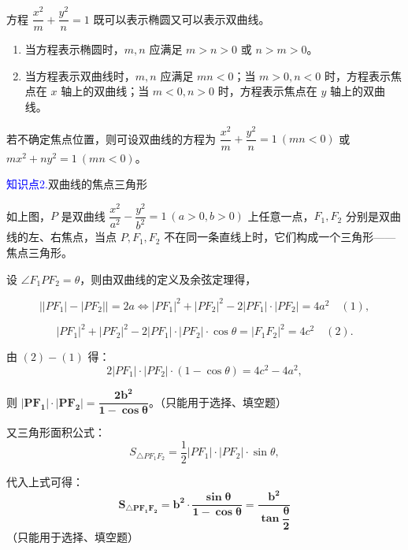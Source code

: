 \documentclass{article}
\begin{document}
\begin{tcolorbox}[colback=blue!10,colframe=blue!70!black,title=]
方程 $\dfrac{x^2}{m}+\dfrac{y^2}{n}=1$ 既可以表示椭圆又可以表示双曲线。
\begin{enumerate}
    \renewcommand{\labelenumi}{(\arabic{enumi})} %
    \item 当方程表示椭圆时，$m,n$ 应满足 $m>n>0$ 或 $n>m>0$。
    \item 当方程表示双曲线时，$m,n$ 应满足 $mn<0$；当 $m>0,n<0$ 时，方程表示焦点在 $x$ 轴上的双曲线；当 $m<0,n>0$ 时，方程表示焦点在 $y$ 轴上的双曲线。
\end{enumerate}

\noindent 若不确定焦点位置，则可设双曲线的方程为 $\dfrac{x^2}{m}+\dfrac{y^2}{n}=1\ (mn<0)$ 或 $mx^2+ny^2=1\ (mn<0)$。
\end{tcolorbox}
\vspace{2\baselineskip}

\textcolor{blue}{知识点2.}双曲线的焦点三角形
\vspace{2\baselineskip}

如上图，$P$ 是双曲线 $\dfrac{x^2}{a^2}-\dfrac{y^2}{b^2}=1\ (a>0,b>0)$ 上任意一点，$F_1,F_2$ 分别是双曲线的左、右焦点，当点 $P,F_1,F_2$ 不在同一条直线上时，它们构成一个三角形——焦点三角形。


\noindent 设 $\angle F_1PF_2=\theta$，则由双曲线的定义及余弦定理得，

 $$ \left|\left|PF_1\right| - \left|PF_2\right|\right| = 2a \Leftrightarrow \left|PF_1\right|^2 + \left|PF_2\right|^2 - 2\left|PF_1\right|\cdot\left|PF_2\right| = 4a^2 \quad (1), $$

 $$ \left|PF_1\right|^2 + \left|PF_2\right|^2 - 2\left|PF_1\right|\cdot\left|PF_2\right|\cdot\cos\theta = \left|F_1F_2\right|^2 = 4c^2 \quad (2).$$


\noindent 由 $(2) - (1)$ 得：
$$2\left|PF_1\right|\cdot\left|PF_2\right|\cdot(1-\cos\theta) = 4c^2 - 4a^2,$$

\noindent 则 $\boldsymbol{\left|PF_1\right|\cdot\left|PF_2\right| = \dfrac{2b^2}{1-\cos\theta}}$。（只能用于选择、填空题）

\vspace{0.5em}
\noindent 又三角形面积公式：
$$S_{\triangle PF_1F_2} = \dfrac{1}{2}\left|PF_1\right|\cdot\left|PF_2\right|\cdot\sin\theta,$$

\noindent 代入上式可得：
$$\boldsymbol{S_{\triangle PF_1F_2} = b^2\cdot\dfrac{\sin\theta}{1-\cos\theta} = \dfrac{b^2}{\tan\dfrac{\theta}{2}}}$$
（只能用于选择、填空题）
\end{document}
